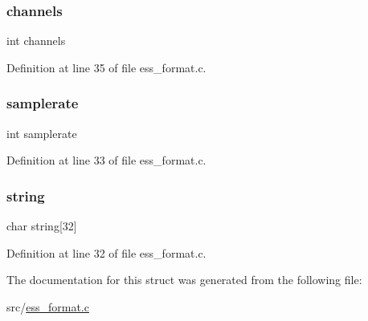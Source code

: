 \subsubsection{\texorpdfstring{channels}{channels}}
{\footnotesize\ttfamily int channels}



Definition at line 35 of file ess\+\_\+format.\+c.

\mbox{\label{struct__format2human_ac38751c7169cfeb9325a947cc0484286}} 
\subsubsection{\texorpdfstring{samplerate}{samplerate}}
{\footnotesize\ttfamily int samplerate}



Definition at line 33 of file ess\+\_\+format.\+c.

\mbox{\label{struct__format2human_a14f2551e7b5032527b89aa2d4025523a}} 
\subsubsection{\texorpdfstring{string}{string}}
{\footnotesize\ttfamily char string\mbox{[}32\mbox{]}}



Definition at line 32 of file ess\+\_\+format.\+c.



The documentation for this struct was generated from the following file\+:\begin{DoxyCompactItemize}
\item 
src/\hyperlink{ess__format_8c}{ess\+\_\+format.\+c}\end{DoxyCompactItemize}
